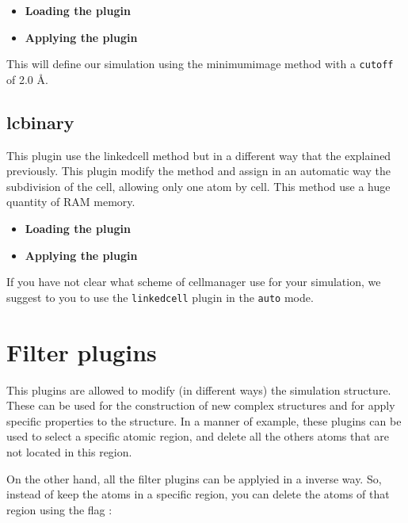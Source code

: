 \begin{itemize}
 \item \textbf{Loading the plugin}
 \item \textbf{Applying the plugin}
\end{itemize}

This will define our simulation using the minimumimage method with a
\verb|cutoff| of 2.0 \AA.

\subsection{lcbinary}
This plugin use the linkedcell method but in a different way that the explained
previously. This plugin modify the method and assign in an automatic way the
subdivision of the cell, allowing only one atom by cell. This method use a huge
quantity of RAM memory.

\begin{itemize}
 \item \textbf{Loading the plugin}
 \item \textbf{Applying the plugin}
\end{itemize}

If you have not clear what scheme of cellmanager use for your simulation, we
suggest to you to use the \verb|linkedcell| plugin in the \verb|auto| mode.

\section{Filter plugins}
This plugins are allowed to modify (in different ways) the simulation
structure. These can be used for the construction of new complex structures and
for apply specific properties to the structure. In a manner of example, these
plugins can be used to select a specific atomic region, and delete all the
others atoms that are not located in this region.

On the other hand, all the filter plugins can be applyied in a inverse way. So,
instead of keep the atoms in a specific region, you can delete the atoms of
that region using the flag :


